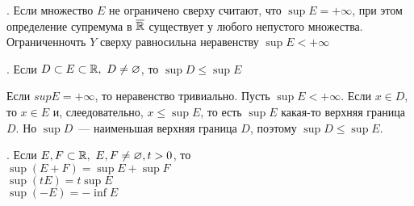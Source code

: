 . Если множество $E$ не ограничено сверху считают, что $\sup E = +\infty$, при этом определение супремума в $\overline{\mathbb{R}}$ существует у любого непустого множества. Ограниченночть $Y$ сверху равносильна неравенству $\sup E < +\infty$

. Если $D \subset E\subset \mathbb{R},\ D \neq \varnothing$, то $\sup D \le \sup E$

\D Если $sup E = +\infty$, то неравенство тривиально. Пусть $\sup E < +\infty$. Если $x \in D$, то $x \in E$ и, слеедовательно, $x \le \sup E$, то есть $\sup E$ какая-то верхняя граница $D$. Но $\sup D$~--- наименьшая верхняя граница $D$, поэтому $\sup D \le \sup E$.

. Если $E, F \subset \mathbb{R},\ E, F \neq \varnothing, t > 0$, то\\
$\sup(E + F) = \sup E +\sup F$\\
$\sup(tE) = t\sup E$\\
$\sup(-E) = -\inf E$